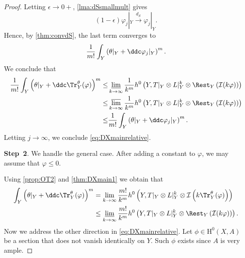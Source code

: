 \begin{proof}
Letting $\epsilon\to0+$, \cref{lma:dSsmallmult} gives
\[
    (1-\epsilon)\varphi_j|_Y\xrightarrow{d_S}\varphi_j|_Y.
\]
Hence, by \cref{thm:convdS}, the last term converges to
\[
    \frac{1}{m!}\int_Y \left(\theta|_Y+\ddc\varphi_j|_Y\right)^m.
\]
We conclude that
\[
\begin{aligned}
\frac{1}{m!}\int_Y \left(\theta|_Y+\ddc\Tr_Y^{\theta}(\varphi)\right)^m\leq & \varliminf_{k \to \infty} \frac{1}{k^m} h^0\left(Y, T|_Y\otimes L|_Y^k\otimes \Rest_Y\left(\mathcal{I}(k\varphi)\right)\right) \\
\leq & \varlimsup_{k \to \infty} \frac{1}{k^m} h^0\left(Y, T|_Y\otimes L|_Y^k\otimes \Rest_Y\left(\mathcal{I}(k\varphi)\right)\right)\\
\leq & \frac{1}{m!} \int_Y \left(\theta|_Y+\ddc\varphi_j|_Y\right)^m.
\end{aligned}
\]
Letting $j\to \infty$, we conclude \eqref{eq:DXmainrelative}.

\textbf{Step~2}. We handle the general case. After adding a constant to $\varphi$, we may assume that $\varphi\leq 0$.

Using \cref{prop:OT2} and \cref{thm:DXmain1} we obtain that
\[
\begin{aligned}
    \int_Y \left(\theta|_Y+\ddc \Tr_Y^{\theta}(\varphi)\right)^m &= \lim_{k \to \infty} \frac{m!}{k^m} h^0\left(Y,T|_Y \otimes L|_Y^k \otimes \mathcal{I}\left(k\Tr_Y^{\theta}(\varphi)\right)\right)\\
    & \leq \varliminf_{k \to \infty} \frac{m!}{k^m} h^0\left(Y,T|_Y \otimes L|_Y^k \otimes \Rest_Y\left(\mathcal{I}(k\varphi)\right)\right).
\end{aligned}
\]
Now we address the other direction in \eqref{eq:DXmainrelative}. Let $\phi \in \mathrm{H}^0(X,A)$ be a section that does not vanish identically on $Y$. Such $\phi$ exists since $A$ is very ample.


\end{proof}
